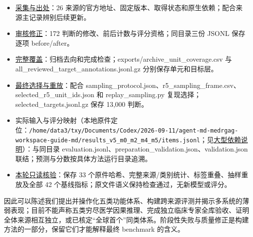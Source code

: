 \documentclass[
  11pt,
  a4paper,
]{article}
\providecommand{\tightlist}{%
  \setlength{\itemsep}{0pt}\setlength{\parskip}{0pt}}
\begin{document}
\begin{itemize}
\tightlist
\item
  \href{https://github.com/xiotakut/cf_mrg/blob/main/papers/2026-10-02_cf_moa/author_dossier/sources/b4ae126e9fdf_source_release_notes.json}{采集与出处}：26
  来源的官方地址、固定版本、取得状态和原生依赖；配合来源主记录辨别后续更新。
\item
  \href{https://github.com/xiotakut/cf_mrg/blob/main/papers/2026-10-02_cf_moa/author_dossier/sources/12ce0fc69fe0_summary.json}{审核修正}：172
  判断的修改、前后计数与评分资格；同目录三份 JSONL 保存逐项
  before/after。
\item
  \href{https://github.com/xiotakut/cf_mrg/blob/main/papers/2026-10-02_cf_moa/author_dossier/sources/9a38cd436827_completion_audit.json}{完整覆盖}：归档去向和完成检查；exports/archive\_unit\_coverage.csv
  与
  all\_\allowbreak{}reviewed\_\allowbreak{}target\_\allowbreak{}annotations.\allowbreak{}jsonl.\allowbreak{}gz
  分别保存单元和目标层。
\item
  \href{https://github.com/xiotakut/cf_mrg/blob/main/papers/2026-10-02_cf_moa/author_dossier/sources/7782d9b52d30_manifest.json}{最终选择与重放}：配合
  sampling\_protocol.json、r5\_sampling\_frame.csv、selected\_r5\_unit\_ids.json
  和 replay\_\allowbreak{}sampling.\allowbreak{}py
  复现选择；selected\_targets.jsonl.gz 保存 13,000 判断。
\item
  实际输入与评分映射（本地原件定位：\texttt{/\allowbreak{}home/\allowbreak{}data3/\allowbreak{}txy/\allowbreak{}Documents/\allowbreak{}Codex/\allowbreak{}2026-\allowbreak{}09-\allowbreak{}11/\allowbreak{}agent-\allowbreak{}md-\allowbreak{}medrgag-\allowbreak{}workspace-\allowbreak{}guide-\allowbreak{}md/\allowbreak{}results\_\allowbreak{}v5\_\allowbreak{}m0\_\allowbreak{}m2\_\allowbreak{}m4\_\allowbreak{}m5/\allowbreak{}items.\allowbreak{}jsonl}；见\href{https://github.com/xiotakut/cf_mrg/blob/main/papers/2026-10-02_cf_moa/author_dossier/LOCAL_DEPENDENCIES.md}{大型依赖说明}）：与同目录
  evaluation.jsonl、preparation\_validation.json、validation.json
  联结；预测与分数按具体方法运行目录追溯。
\item
  \href{https://github.com/xiotakut/cf_mrg/blob/main/papers/2026-10-02_cf_moa/author_dossier/sources/9fc971a0bead_benchmark_contribution_audit.json}{本轮只读核验}：保存
  33 个原件哈希、完整来源/类别统计、标签重叠、抽样重放及全部 42
  个基线指标；原文件语义保持检查通过，无新模型或评分。
\end{itemize}

因此可以陈述我们提出并操作化五类功能体系、构建跨来源评测并揭示多系统的薄弱表现；目前不能声称五类穷尽医学因果推理、完成独立临床专家全库验收、证明全体来源相互独立，或已核定``全球首个''同类体系。阶段性失败与质量修正是构建方法的一部分，保留它们才能解释最终
benchmark 的含义。
\end{document}
